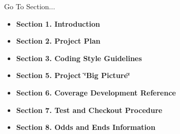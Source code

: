 \begin{Desc}
\item[Go To Section...]\begin{itemize}
\item {\bf Section 1.  Introduction} \item {\bf Section 2.  Project Plan} \item {\bf Section 3.  Coding Style Guidelines} \item {\bf Section 5.  Project \char`\"{}Big Picture\char`\"{}} \item {\bf Section 6.  Coverage Development Reference} \item {\bf Section 7.  Test and Checkout Procedure} \item {\bf Section 8.  Odds and Ends Information} \end{itemize}
\end{Desc}
